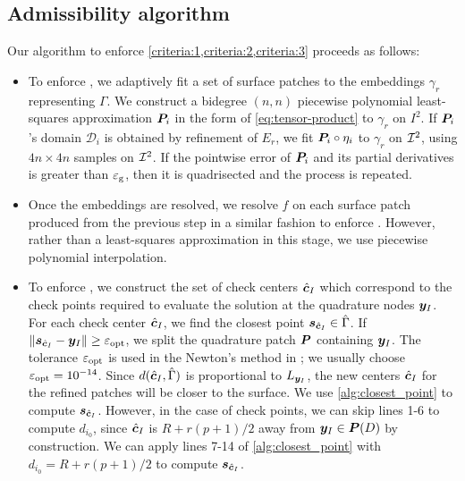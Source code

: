\subsection{Admissibility algorithm\label{sec:admissible_algo}}
Our algorithm to enforce \cref{criteria:1,criteria:2,criteria:3} proceeds as follows:
\begin{itemize}
    \item To enforce , we adaptively fit a set of surface patches to the embeddings $\gamma_r$ representing $\Gamma$.
We construct a bidegree $(n,n)$ piecewise polynomial least-squares approximation ${\bm{P}}_i$ in the form of \cref{eq:tensor-product} to $\gamma_r$ on $I^2$.
        If ${\bm{P}}_i$'s domain $\mathcal{D}_i$ is obtained by refinement of $E_r$, we fit ${\bm{P}}_i \circ \eta_i$ to $\gamma_r$ on ${\mathcal{I}}^2$, using $4n \times 4n$ samples on ${\mathcal{I}}^2$. 
        If the pointwise error of ${\bm{P}}_i$ and its partial derivatives is greater than ${\varepsilon_{\mathrm{g}}}$, then it is quadrisected and the process is repeated. 

\item  Once the embeddings are resolved, we resolve $f$ on each surface patch produced from the previous step in a similar fashion to enforce .
  However, rather than a least-squares approximation in this stage, we use piecewise polynomial interpolation.
 
\item To enforce , we construct the set of check centers ${\hat{\bm{c}}}_I$ which correspond to the check points required to evaluate the solution at the quadrature nodes ${\bm{y}}_I$.
    For each check center ${\hat{\bm{c}}}_I$, we find the closest point $\bm{s}_{{\hat{\bm{c}}}_I} \in \hat{\Gamma}$.
    If $ \|\bm{s}_{{\hat{\bm{c}}}_I} - {\bm{y}}_I\| \geq {\varepsilon_{\ensuremath{\mathrm{opt}}}}$, we split the quadrature patch ${\bm{P}}$ containing ${\bm{y}}_I$.
        The tolerance ${\varepsilon_{\mathrm{opt}}}$ is used in the Newton's method in \cite[Section 2]{morse2020bsupplementary}; we usually choose ${\varepsilon_{\mathrm{opt}}}=10^{-14}$.
Since $d({\hat{\bm{c}}}_I,\hat{\Gamma})$ is proportional to $L_{{\bm{y}}_I}$, the new centers ${\hat{\bm{c}}}_I$ for the refined patches  will be closer to the surface. 
    We use \cref{alg:closest_point} to compute $\bm{s}_{{\hat{\bm{c}}}_I}$.
        However, in the case of check points, we can skip lines 1-6 to compute $d_{i_0}$,  since ${\hat{\bm{c}}}_I$ is $R + r(p+1)/2$ away from ${\bm{y}}_I \in {\bm{P}}(D)$ by construction.
        We can apply lines 7-14 of \cref{alg:closest_point} with $d_{i_0} = R + r(p+1)/2$ to compute $\bm{s}_{{\hat{\bm{c}}}_I}$.
\end{itemize}

